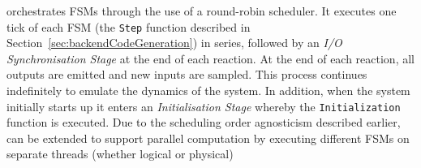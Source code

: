 \ourTool orchestrates \acp{FSM} through the use of a round-robin
scheduler.  It executes one tick of each \ac{FSM} (the \texttt{Step} function 
described in Section~\ref{sec:backendCodeGeneration}) in series, followed by an 
\emph{I/O Synchronisation Stage} at the end of each reaction.  
At the end of each reaction, all outputs are emitted and new inputs are sampled.
  This process continues indefinitely to emulate the 
dynamics of the system.  In addition, when the system initially starts up it 
enters an \emph{Initialisation Stage} whereby the \texttt{Initialization} 
function is executed.
Due to the scheduling order agnosticism described earlier, 
 \ourTool can be extended to support parallel computation by executing 
different \acp{FSM} on separate threads (whether logical or physical)
